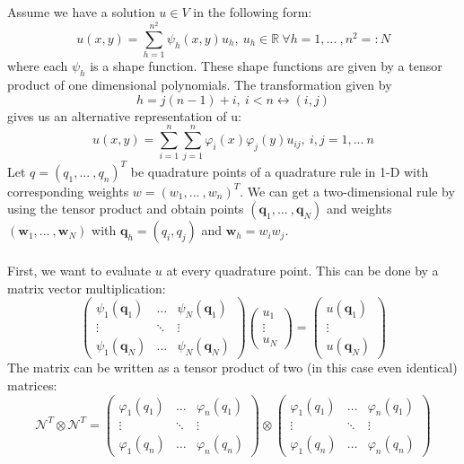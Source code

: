 
Assume we have a solution $u \in V$ in the following form:
\begin{equation}
u(x,y)=\sum_{h=1}^{n^2} \psi_h (x,y) u_h,\ u_h \in \mathbb{R} \ \forall h =1,...\ ,n^2=:N
\end{equation}
where each $\psi_h$ is a shape function. These shape functions are given by a tensor product of one dimensional polynomials. The transformation given by 
\begin{equation}
h=j(n-1)+i,\ i<n \leftrightarrow (i,j)
\end{equation}
gives us an alternative representation of u:
\begin{equation}
u(x,y)=\sum_{i=1}^n \sum_{j=1}^n \varphi_i(x) \varphi_j(y) u_{ij}, \ i,j =1,...\ n
\end{equation}
Let $q=(q_1,...\ ,q_n)^T$ be quadrature points of a quadrature rule in 1-D with corresponding weights $w=(w_1,...\ ,w_n)^T$. We can get a two-dimensional rule by using the tensor product and obtain points $(\bm{q}_1,...\ ,\bm{q}_N)$ and weights $(\bm{w}_1,...\ ,\bm{w}_N)$ with $\bm{q}_h=(q_i,q_j)$ and $\bm{w}_h=w_i w_j$.\\ \\
First, we want to evaluate $u$ at every quadrature point. This can be done by a matrix vector multiplication:
\begin{equation}
\begin{pmatrix}
\psi_1(\bm{q}_1) & \hdots & \psi_N(\bm{q}_1) \\
\vdots & \ddots & \vdots \\
\psi_1(\bm{q}_N) & \hdots & \psi_N(\bm{q}_N)
\end{pmatrix}
\begin{pmatrix}
u_1 \\
\vdots \\
u_N
\end{pmatrix}
=
\begin{pmatrix}
u(\bm{q}_1) \\
\vdots \\
u(\bm{q}_N)
\end{pmatrix}
\end{equation}
The matrix can be written as a tensor product of two (in this case even identical) matrices:
\begin{equation}
\mathcal{N}^T \otimes \mathcal{N}^T =
\begin{pmatrix}
\varphi_1(q_1) & \hdots & \varphi_n(q_1) \\
\vdots & \ddots & \vdots \\
\varphi_1(q_n) & \hdots & \varphi_n(q_n)
\end{pmatrix}
\otimes
\begin{pmatrix}
\varphi_1(q_1) & \hdots & \varphi_n(q_1) \\
\vdots & \ddots & \vdots \\
\varphi_1(q_n) & \hdots & \varphi_n(q_n)
\end{pmatrix}
\end{equation}

